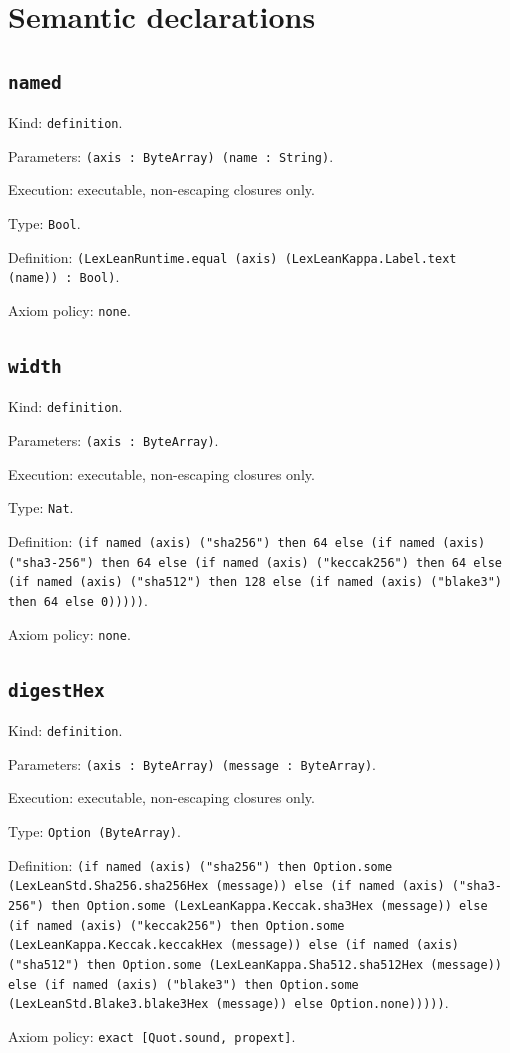 \documentclass[11pt]{article}
\begin{document}
\section*{Semantic declarations}
\subsection*{\texttt{named}}
\noindent Kind: \texttt{definition}.\par
\noindent Parameters: \texttt{(axis : ByteArray) (name : String)}.\par
\noindent Execution: executable, non-escaping closures only.\par
\noindent Type: \texttt{Bool}.\par
\noindent Definition: \texttt{(LexLeanRuntime.equal (axis) (LexLeanKappa.Label.text (name)) : Bool)}.\par
\noindent Axiom policy: \texttt{none}.\par
\subsection*{\texttt{width}}
\noindent Kind: \texttt{definition}.\par
\noindent Parameters: \texttt{(axis : ByteArray)}.\par
\noindent Execution: executable, non-escaping closures only.\par
\noindent Type: \texttt{Nat}.\par
\noindent Definition: \texttt{(if named (axis) ("sha256") then 64 else (if named (axis) ("sha3-256") then 64 else (if named (axis) ("keccak256") then 64 else (if named (axis) ("sha512") then 128 else (if named (axis) ("blake3") then 64 else 0)))))}.\par
\noindent Axiom policy: \texttt{none}.\par
\subsection*{\texttt{digestHex}}
\noindent Kind: \texttt{definition}.\par
\noindent Parameters: \texttt{(axis : ByteArray) (message : ByteArray)}.\par
\noindent Execution: executable, non-escaping closures only.\par
\noindent Type: \texttt{Option (ByteArray)}.\par
\noindent Definition: \texttt{(if named (axis) ("sha256") then Option.some (LexLeanStd.Sha256.sha256Hex (message)) else (if named (axis) ("sha3-256") then Option.some (LexLeanKappa.Keccak.sha3Hex (message)) else (if named (axis) ("keccak256") then Option.some (LexLeanKappa.Keccak.keccakHex (message)) else (if named (axis) ("sha512") then Option.some (LexLeanKappa.Sha512.sha512Hex (message)) else (if named (axis) ("blake3") then Option.some (LexLeanStd.Blake3.blake3Hex (message)) else Option.none)))))}.\par
\noindent Axiom policy: \texttt{exact [Quot.sound, propext]}.\par
\end{document}
